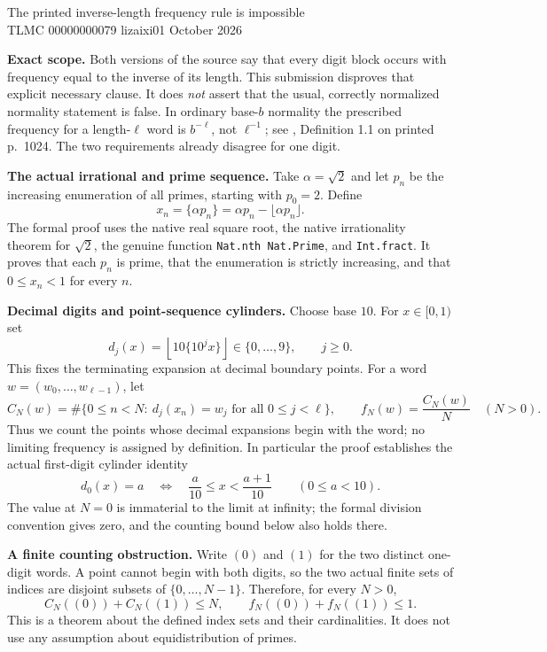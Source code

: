 \documentclass[10pt,a4paper]{article}
\begin{document}
\begin{center}
{\Large The printed inverse-length frequency rule is impossible}\\[4pt]
TLMC 00000000079 \quad lizaixi01  October 2026
\end{center}

\textbf{Exact scope.}
Both versions of the source say that every digit block occurs with frequency equal
to the inverse of its length. This submission disproves that explicit necessary
clause. It does \emph{not} assert that the usual, correctly normalized normality
statement is false. In ordinary base-$b$ normality the prescribed frequency for
a length-$\ell$ word is $b^{-\ell}$, not $\ell^{-1}$; see \cite{ajm},
Definition 1.1 on printed p.~1024. The two requirements already disagree for one digit.

\textbf{The actual irrational and prime sequence.}
Take $\alpha=\sqrt2$ and let $p_n$ be the increasing enumeration of all primes,
starting with $p_0=2$. Define
\[
 x_n=\{\alpha p_n\}=\alpha p_n-\lfloor\alpha p_n\rfloor .
\]
The formal proof uses the native real square root, the native irrationality
theorem for $\sqrt2$, the genuine function \texttt{Nat.nth Nat.Prime}, and
\texttt{Int.fract}. It proves that each $p_n$ is prime, that the enumeration is
strictly increasing, and that $0\le x_n<1$ for every $n$.

\textbf{Decimal digits and point-sequence cylinders.}
Choose base $10$. For $x\in[0,1)$ set
\[
 d_j(x)=\left\lfloor 10\{10^j x\}\right\rfloor\in\{0,\ldots,9\},\qquad j\ge0.
\]
This fixes the terminating expansion at decimal boundary points. For a word
$w=(w_0,\ldots,w_{\ell-1})$, let
\[
 C_N(w)=\#\{0\le n<N:\ d_j(x_n)=w_j\text{ for all }0\le j<\ell\},
 \qquad f_N(w)=\frac{C_N(w)}{N}\quad(N>0).
\]
Thus we count the points whose decimal expansions begin with the word; no limiting
frequency is assigned by definition. In particular the proof establishes the actual
first-digit cylinder identity
\[
 d_0(x)=a \quad\Longleftrightarrow\quad
 \frac a{10}\le x<\frac{a+1}{10}\qquad(0\le a<10).
\]
The value at $N=0$ is immaterial to the limit at infinity; the formal division
convention gives zero, and the counting bound below also holds there.

\textbf{A finite counting obstruction.}
Write $(0)$ and $(1)$ for the two distinct one-digit words. A point cannot begin
with both digits, so the two actual finite sets of indices are disjoint subsets of
$\{0,\ldots,N-1\}$. Therefore, for every $N>0$,
\[
 C_N((0))+C_N((1))\le N,
 \qquad f_N((0))+f_N((1))\le1. \tag{1}
\]
This is a theorem about the defined index sets and their cardinalities. It does not
use any assumption about equidistribution of primes.
\end{document}
